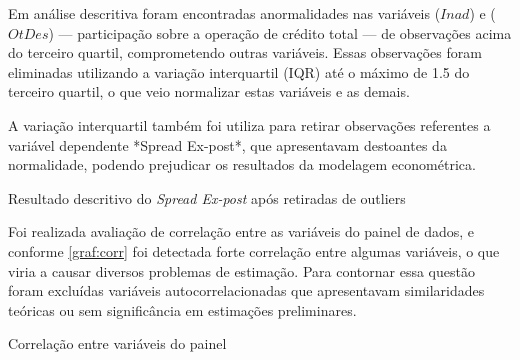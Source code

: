 \documentclass[
  12pt,
  12pt,
  openright,
  oneside,
  a4paper,
  chapter=TITLE,
  section=TITLE,
  subsection=TITLE,
  subsubsection=TITLE,
  english,
  portugues,
  sumario=tradicional]{abntex2}
\begin{document}
\begin{apendicesenv}
Em análise descritiva foram encontradas anormalidades nas variáveis ($Inad$) e ($OtDes$) — participação sobre a operação de crédito total — de observações acima do terceiro quartil, comprometendo outras variáveis. Essas observações foram eliminadas utilizando a variação interquartil (IQR) até o máximo de 1.5 do terceiro quartil, o que veio normalizar estas variáveis e as demais.

A variação interquartil também foi utiliza para retirar observações referentes a variável dependente *Spread Ex-post*, que apresentavam destoantes da normalidade, podendo prejudicar os resultados da modelagem econométrica. 

\begin{table}
\caption{Resultado descritivo do \emph{Spread Ex-post} após retiradas de outliers}
\vspace{1mm}

\vspace{1mm}
\label{tb:summspr}
\vspace{-2mm}
\end{table}

Foi realizada avaliação de correlação entre as variáveis do painel de dados, e conforme \autoref{graf:corr} foi detectada forte correlação entre algumas variáveis, o que viria a causar diversos problemas de estimação. Para contornar essa questão foram excluídas variáveis autocorrelacionadas que apresentavam similaridades teóricas ou sem significância em estimações preliminares.

\begin{grafico}[!htbp]
\vspace{20pt}
\caption{Correlação entre variáveis do painel}
\vspace{-4mm}


\end{grafico}
\end{apendicesenv}
\end{document}
